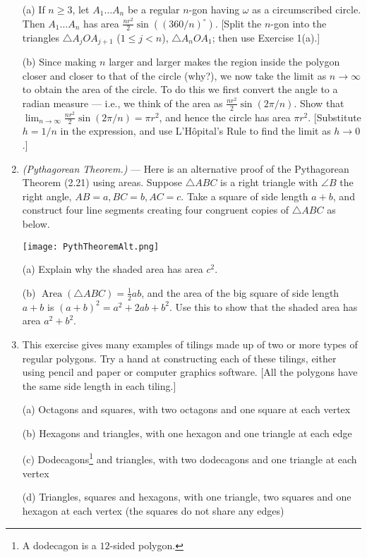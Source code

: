 \documentclass[leqno]{book}
\begin{document}
\begin{enumerate}
(a) If $n\geqslant 3$, let $A_1\dots A_n$ be a regular $n$-gon having $\omega$ as a circumscribed circle.  Then $A_1\dots A_n$ has area $\frac{nr^2}2\sin((360/n)^\circ)$.  [Split the $n$-gon into the triangles $\triangle A_jOA_{j+1}$ ($1\leqslant j<n$), $\triangle A_nOA_1$; then use Exercise 1(a).]

(b) Since making $n$ larger and larger makes the region inside the polygon closer and closer to that of the circle (why?), we now take the limit as $n\to\infty$ to obtain the area of the circle.  To do this we first convert the angle to a radian measure \---- i.e., we think of the area as $\frac{nr^2}2\sin(2\pi/n)$.  Show that $\lim_{n\to\infty}\frac{nr^2}2\sin(2\pi/n)=\pi r^2$, and hence the circle has area $\pi r^2$.  [Substitute $h=1/n$ in the expression, and use L'H\^opital's Rule to find the limit as $h\to 0$.]

\item\emph{(Pythagorean Theorem.)} \---- Here is an alternative proof of the Pythagorean Theorem (2.21) using areas.  Suppose $\triangle ABC$ is a right triangle with $\angle B$ the right angle, $AB=a,BC=b,AC=c$.  Take a square of side length $a+b$, and construct four line segments creating four congruent copies of $\triangle ABC$ as below.
\begin{center}\texttt{[image: PythTheoremAlt.png]}\end{center}
(a) Explain why the shaded area has area $c^2$.

(b) $\operatorname{Area}(\triangle ABC)=\frac 12ab$, and the area of the big square of side length $a+b$ is $(a+b)^2=a^2+2ab+b^2$.  Use this to show that the shaded area has area $a^2+b^2$.

\item This exercise gives many examples of tilings made up of two or more types of regular polygons.  Try a hand at constructing each of these tilings, either using pencil and paper or computer graphics software.  [All the polygons have the same side length in each tiling.]

(a) Octagons and squares, with two octagons and one square at each vertex

(b) Hexagons and triangles, with one hexagon and one triangle at each edge

(c) Dodecagons\footnote{A dodecagon is a $12$-sided polygon.} and triangles, with two dodecagons and one triangle at each vertex

(d) Triangles, squares and hexagons, with one triangle, two squares and one hexagon at each vertex (the squares do not share any edges)


\end{enumerate}
\end{document}
